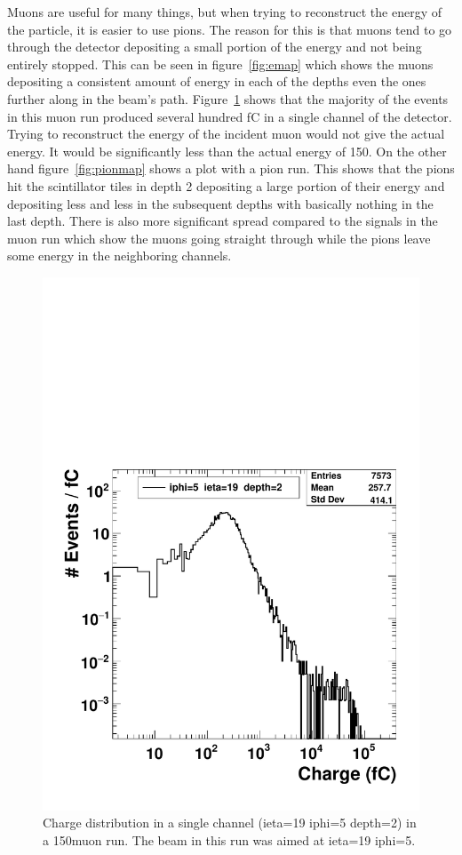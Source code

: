 Muons are useful for many things, but when trying to reconstruct the energy of the particle, it is easier to use pions. The reason for this is that muons tend to go through the detector depositing a small portion of the energy and not being entirely stopped. This can be seen in figure~\ref{fig:emap} which shows the muons depositing a consistent amount of energy in each of the depths even the ones further along in the beam's path. Figure~\ref{fig:Muon} shows that the majority of the events in this muon run produced several hundred fC in a single channel of the detector. Trying to reconstruct the energy of the incident muon would not give the actual energy. It would be significantly less than the actual energy of 150\GeV. On the other hand figure~\ref{fig:pionmap} shows a plot with a pion run. This shows that the pions hit the scintillator tiles in depth 2 depositing a large portion of their energy and depositing less and less in the subsequent depths with basically nothing in the last depth. There is also more significant spread compared to the signals in the muon run which show the muons going straight through while the pions leave some energy in the neighboring channels.

\begin{figure}
\centering
\includegraphics[width=0.7\linewidth]{Figures/MuonCharge.pdf}
\caption{Charge distribution in a single channel (ieta=19 iphi=5 depth=2) in a 150\GeV muon run. The beam in this run was aimed at ieta=19 iphi=5.}
\label{fig:Muon}
\end{figure}

